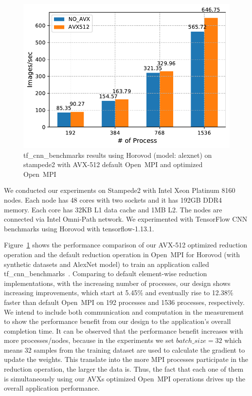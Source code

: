 \documentclass[5p,times,twocolumn]{elsarticle}
\newcommand{\ompi}[0]{Open~MPI\xspace}
\begin{document}
\begin{figure}[h]
    \centering
    \includegraphics[width=\linewidth]{horovod_tacc.pdf}
    \caption{tf\_cnn\_benchmarks results using Horovod (model: alexnet) on stampede2
    with AVX-512 default \ompi and optimized \ompi}
    \label{fig:horovodtacc}
\end{figure}

We conducted our experiments on Stampede2 with Intel Xeon Platinum 8160 nodes. Each node has 48 cores with two sockets and it has 192GB DDR4 memory.
Each core has 32KB L1 data cache and 1MB L2. The nodes are connected via Intel Omni-Path network.
We experimented with TensorFlow CNN benchmarks using Horovod with tensorflow-1.13.1.

Figure~\ref{fig:horovodtacc} shows the performance comparison of
our AVX-512 optimized reduction operation and the default reduction operation in \ompi for Horovod (with synthetic datasets and AlexNet model) to train an application called tf\_cnn\_benchmarks~\cite{cnnTensorflow}.
Comparing to default element-wise reduction
implementations, with the increasing number of processes,
our design shows increasing improvements, which start at 5.45\% and
eventually rise to 12.38\% faster than default \ompi on 192 processes and 1536 processes, respectively.
We intend to include both communication and computation in the measurement to show the performance
benefit from our design to the application's overall completion time.
It can be observed that the performance benefit increases with more processes/nodes,
because in the experiments we set $batch\_size = 32$ which means 32 samples from the training
dataset are used to calculate the gradient to update the weights. This translate into the more
MPI processes participate in the reduction operation, the larger the data is.
Thus, the fact that each one of them is simultaneously using our AVXs optimized \ompi
operations drives up the overall application performance.
\end{document}
